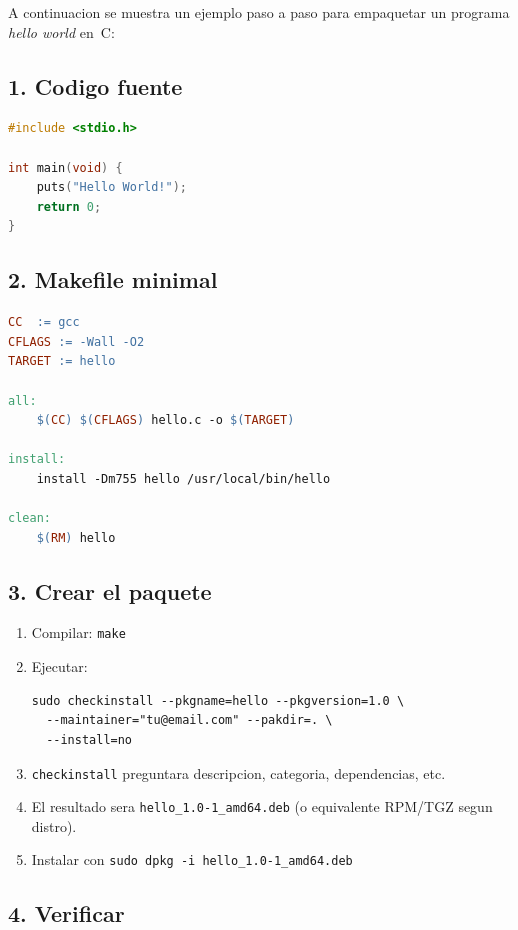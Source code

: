 A continuacion se muestra un ejemplo paso a paso para empaquetar un programa \emph{hello world} en~C:

\subsection*{1. Codigo fuente}

\begin{lstlisting}[language=C, caption={Archivo \texttt{hello.c}}]
#include <stdio.h>

int main(void) {
    puts("Hello World!");
    return 0;
}
\end{lstlisting}

\subsection*{2. Makefile minimal}

\begin{lstlisting}[language=make, caption={Archivo \texttt{Makefile}}]
CC  := gcc
CFLAGS := -Wall -O2
TARGET := hello

all:
	$(CC) $(CFLAGS) hello.c -o $(TARGET)

install:
	install -Dm755 hello /usr/local/bin/hello

clean:
	$(RM) hello
\end{lstlisting}

\subsection*{3. Crear el paquete}

\begin{enumerate}[label=\alph*)]
  \item Compilar: \texttt{make}
  \item Ejecutar:  
\begin{lstlisting}
sudo checkinstall --pkgname=hello --pkgversion=1.0 \
  --maintainer="tu@email.com" --pakdir=. \
  --install=no
\end{lstlisting}
  \item \texttt{checkinstall} preguntara descripcion, categoria, dependencias, etc.  
  \item El resultado sera \texttt{hello\_1.0-1\_amd64.deb} (o equivalente RPM/TGZ segun distro).
  \item Instalar con \texttt{sudo dpkg -i hello\_1.0-1\_amd64.deb}
\end{enumerate}

\subsection*{4. Verificar}

